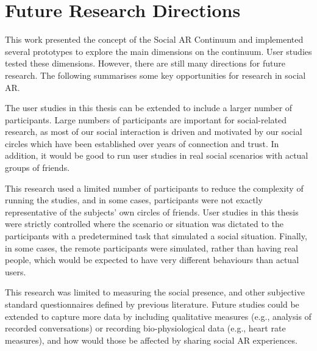 

\section{Future Research Directions}

This work presented the concept of the Social AR Continuum and implemented several prototypes to explore the main dimensions on the continuum. User studies tested these dimensions. However, there are still many directions for future research. The following summarises some key opportunities for research in social AR.

The user studies in this thesis can be extended to include a larger number of participants. Large numbers of participants are important for social-related research, as most of our social interaction is driven and motivated by our social circles which have been established over years of connection and trust.  In addition, it would be good to run user studies in real social scenarios with actual groups of friends.

This research used a limited number of participants to reduce the complexity of running the studies, and in some cases, participants were not exactly representative of the subjects' own circles of friends. User studies in this thesis were strictly controlled where the scenario or situation was dictated to the participants with a predetermined task that simulated a social situation. Finally, in some cases, the remote participants were simulated, rather than having real people, which would be expected to have very different behaviours than actual users.

This research was limited to measuring the social presence, and other subjective standard questionnaires defined by previous literature. Future studies could be extended to capture more data by including qualitative measures (e.g., analysis of recorded conversations) or recording bio-physiological data (e.g., heart rate measures), and how would those be affected by sharing social AR experiences.
 
